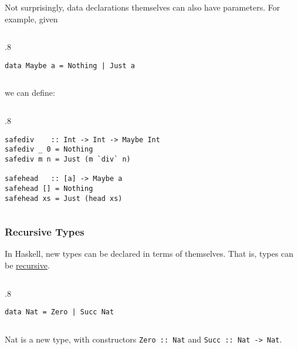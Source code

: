 \documentclass{beamer}
\newenvironment{codeblock}[1][.8]{%
\begin{columns}
\begin{column}{#1\linewidth}
\begin{exampleblock}{}}{%
\end{exampleblock}
\end{column}
\end{columns}}
\def\slideskip{\vskip 0.1in}
\begin{document}
\begin{frame}[fragile]
\large

Not surprisingly, data declarations themselves can 
also have parameters.  For example, given 
\slideskip

\begin{codeblock}
\begin{verbatim}
data Maybe a = Nothing | Just a 
\end{verbatim}
\end{codeblock}

\slideskip
we can define:
\slideskip

\begin{codeblock}
\begin{verbatim}
safediv    :: Int -> Int -> Maybe Int 
safediv _ 0 = Nothing 
safediv m n = Just (m `div` n) 

safehead   :: [a] -> Maybe a 
safehead [] = Nothing 
safehead xs = Just (head xs) 
\end{verbatim}
\end{codeblock}

\end{frame}

\begin{frame}[fragile]
\Large

\frametitle{Recursive Types}

In Haskell, new types can be declared in terms of 
themselves.  That is, types can be \underline{recursive}. 

\slideskip

\begin{codeblock}
\begin{verbatim}
data Nat = Zero | Succ Nat
\end{verbatim}
\end{codeblock}

\slideskip
Nat is a new type, with constructors 
{\tt Zero :: Nat} and {\tt Succ :: Nat -> Nat}.

\end{frame}
\end{document}
